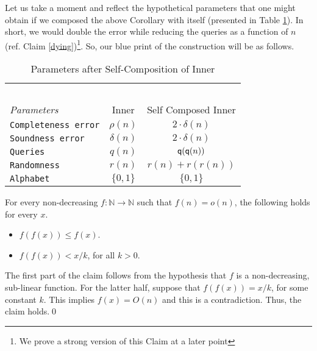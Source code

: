  \noindent Let us take a moment and reflect the hypothetical
 parameters that one might obtain if we composed the above Corollary
 with itself (presented in Table \ref{table:selfcompose}). In short,
 we would double the error while reducing the queries as a function of
 $n$ (ref. Claim \ref{dying})\footnote{We prove a strong version of
   this Claim at a later point}. So, our blue print of the
 construction will be as follows.

 \begin{table}[h]
\centering 
\begin{tabular}{|l|c|c|}
  \hline 
  \ & & \\
  {\em Parameters}  &{\sc Inner} & \parbox{1.65in} {\sc Self Composed Inner}  \\
  \hline
  \hline
  {\tt Completeness error} & $\rho(n)$ & $2 \cdot \delta(n)$  \\  
  {\tt Soundness error} &  $\delta(n)$ & $2 \cdot \delta(n)$   \\
  {\tt Queries} &   $q(n)$ & ${\sf q}({\sf q}(n))$  \\
  {\tt Randomness}&  $r(n)$ & $r(n) + r(r(n))$  \\ 
  {\tt Alphabet} & $\{0,1\}$  & $\{0,1\}$ \\
\hline
\end{tabular} %
 \caption{Parameters after Self-Composition of Inner} \label{table:selfcompose}
\end{table}



\begin{claim}\label{dying}
  For every non-decreasing $f : \mathbb{N} \rightarrow \mathbb{N}$
  such that $f(n) = o(n)$, the following holds for every $x$.
\begin{itemize}
\item $f\left(f\left(x\right)\right) \le f(x)$.
\item $f\left(f\left(x\right)\right) <  x/k$, for all $k > 0$.
\end{itemize}
\end{claim}
 The first part of the claim follows from the
hypothesis that $f$ is a non-decreasing, sub-linear function. For the
latter half, suppose that $f\left(f\left(x\right)\right) = x/k$, for
some constant $k$. This implies $f(x) = O(n)$ and this is a
contradiction. Thus, the claim holds.\qed



